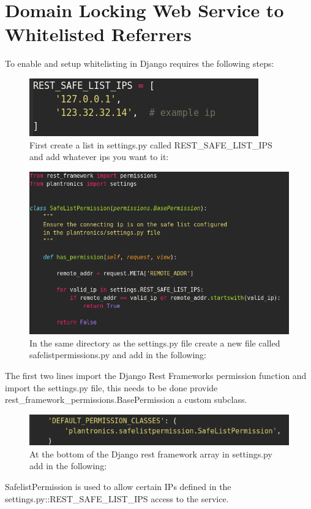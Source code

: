 \documentclass{article}
\begin{document}
	\section{Domain Locking Web Service to Whitelisted Referrers}
    To enable and setup whitelisting in Django requires the following steps:
    
    
    \begin{figure}[!htb]
        \caption{First create a list in settings.py called REST\_SAFE\_LIST\_IPS and add whatever ips you want to it:}
        \includegraphics[scale=0.50]{whitelist1}
    \end{figure}
    
    \begin{figure}[!htb]
        \caption{In the same directory as the settings.py file create a new file called safelistpermissions.py and add in the following:}
       \includegraphics[scale=0.50]{whitelist2}
    \end{figure}
    
        The first two lines import the Django Rest Frameworks permission function and import the settings.py file, this needs to be done provide rest\_framework\_permissions.BasePermission a custom subclass.
        
        \begin{figure}[!htb]
            \caption{At the bottom of the Django rest framework array in settings.py add in the following:}
            \includegraphics[scale=0.50]{whitelist3}
        \end{figure}
        \pagebreak
        SafelistPermission is used to allow certain IPs defined in the settings.py::REST\_SAFE\_LIST\_IPS access to the service.
        \\
 
\end{document}
